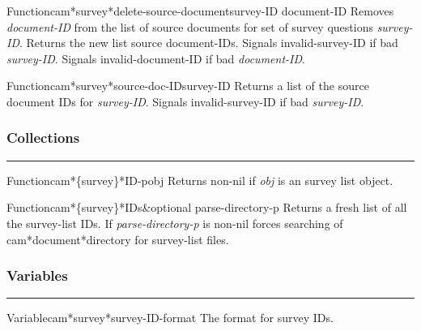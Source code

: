 \begin{functiondoc}{Function}{cam*survey*delete-source-document}{survey-ID document-ID}
Removes {\em document-ID} from the list of source documents for set of survey questions
{\em survey-ID}.
Returns the new list source document-IDs.
Signals invalid-survey-ID if bad {\em survey-ID}.
Signals invalid-document-ID if bad {\em document-ID}.
\end{functiondoc}

\begin{functiondoc}{Function}{cam*survey*source-doc-ID}{survey-ID}
Returns a list of the source document IDs for {\em survey-ID}.
Signals invalid-survey-ID if bad {\em survey-ID}.
\end{functiondoc}


\subsubsection*{Collections}
\par\vspace*{0.00in}\par\hrule\par\medskip\par


\begin{functiondoc}{Function}{cam*\{survey\}*ID-p}{obj}
Returns non-nil if {\em obj} is an survey list object.
\end{functiondoc}

\begin{functiondoc}{Function}{cam*\{survey\}*IDs}{\&optional parse-directory-p}
Returns a fresh list of all the survey-list IDs.
If {\em parse-directory-p} is non-nil forces searching of cam*document*directory for 
survey-list files.
\end{functiondoc}


\subsubsection*{Variables}
\par\vspace*{0.00in}\par\hrule\par\medskip\par


\begin{functiondoc}{Variable}{cam*survey*survey-ID-format}{}
The format for survey IDs.
\end{functiondoc}


